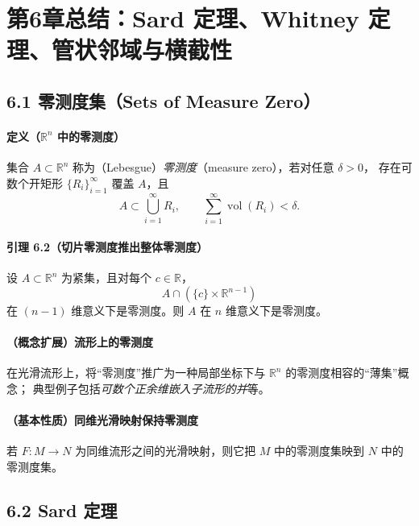 \documentclass[11pt,a4paper]{article}
\begin{document}

\section*{第6章总结：Sard 定理、Whitney 定理、管状邻域与横截性}

\subsection*{6.1 零测度集（Sets of Measure Zero）}

\paragraph{定义（$\mathbb R^n$ 中的零测度）}
集合 $A\subset\mathbb R^n$ 称为（Lebesgue）\emph{零测度}（measure zero），若对任意 $\delta>0$，
存在可数个开矩形 $\{R_i\}_{i=1}^\infty$ 覆盖 $A$，且
\[
A\subset \bigcup_{i=1}^\infty R_i,\qquad \sum_{i=1}^\infty \operatorname{vol}(R_i)<\delta.
\]

\paragraph{引理 6.2（切片零测度推出整体零测度）}
设 $A\subset\mathbb R^n$ 为紧集，且对每个 $c\in\mathbb R$，
\[
A\cap(\{c\}\times\mathbb R^{n-1})
\]
在 $(n-1)$ 维意义下是零测度。则 $A$ 在 $n$ 维意义下是零测度。

\paragraph{（概念扩展）流形上的零测度}
在光滑流形上，将“零测度”推广为一种局部坐标下与 $\mathbb R^n$ 的零测度相容的“薄集”概念；
典型例子包括\emph{可数个正余维嵌入子流形的并}等。

\paragraph{（基本性质）同维光滑映射保持零测度}
若 $F:M\to N$ 为同维流形之间的光滑映射，则它把 $M$ 中的零测度集映到 $N$ 中的零测度集。

\subsection*{6.2 Sard 定理}
\end{document}
